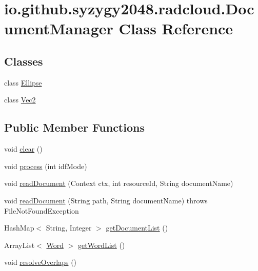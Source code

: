 \hypertarget{classio_1_1github_1_1syzygy2048_1_1radcloud_1_1_document_manager}{}\section{io.\+github.\+syzygy2048.\+radcloud.\+Document\+Manager Class Reference}
\label{classio_1_1github_1_1syzygy2048_1_1radcloud_1_1_document_manager}
\subsection*{Classes}
\begin{DoxyCompactItemize}
\item 
class \mbox{\hyperlink{classio_1_1github_1_1syzygy2048_1_1radcloud_1_1_document_manager_1_1_ellipse}{Ellipse}}
\item 
class \mbox{\hyperlink{classio_1_1github_1_1syzygy2048_1_1radcloud_1_1_document_manager_1_1_vec2}{Vec2}}
\end{DoxyCompactItemize}
\subsection*{Public Member Functions}
\begin{DoxyCompactItemize}
\item 
void \mbox{\hyperlink{classio_1_1github_1_1syzygy2048_1_1radcloud_1_1_document_manager_abc50df59a17e5f00dddb60d56760b106}{clear}} ()
\item 
void \mbox{\hyperlink{classio_1_1github_1_1syzygy2048_1_1radcloud_1_1_document_manager_a93d7c5cd7651bbe8b0769c9d071d4488}{process}} (int idf\+Mode)
\item 
void \mbox{\hyperlink{classio_1_1github_1_1syzygy2048_1_1radcloud_1_1_document_manager_ae2fd7551555ca6e97cab1ea87a4ab477}{read\+Document}} (Context ctx, int resource\+Id, String document\+Name)
\item 
void \mbox{\hyperlink{classio_1_1github_1_1syzygy2048_1_1radcloud_1_1_document_manager_a917f02cb6436d96077b0e093751710ec}{read\+Document}} (String path, String document\+Name)  throws File\+Not\+Found\+Exception 
\item 
Hash\+Map$<$ String, Integer $>$ \mbox{\hyperlink{classio_1_1github_1_1syzygy2048_1_1radcloud_1_1_document_manager_a64e9767900c245d1c77cdf12dc92c807}{get\+Document\+List}} ()
\item 
Array\+List$<$ \mbox{\hyperlink{classio_1_1github_1_1syzygy2048_1_1radcloud_1_1_word}{Word}} $>$ \mbox{\hyperlink{classio_1_1github_1_1syzygy2048_1_1radcloud_1_1_document_manager_a8868166a68ecfa01206268e13c3560ea}{get\+Word\+List}} ()
\item 
void \mbox{\hyperlink{classio_1_1github_1_1syzygy2048_1_1radcloud_1_1_document_manager_ac4e94090407ff6f6c1d3b2f7c02cec83}{resolve\+Overlaps}} ()
\end{DoxyCompactItemize}

